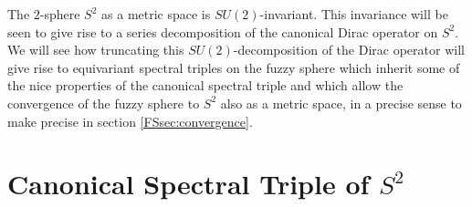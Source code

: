 The $2$-sphere $S^2$ as a metric space is $SU(2)$-invariant. This invariance will be seen to give rise to a series decomposition of the canonical Dirac operator on $S^2$. We will see how truncating this $SU(2)$-decomposition of the Dirac operator will give rise to equivariant spectral triples on the fuzzy sphere which inherit some of the nice properties of the canonical spectral triple and which allow the convergence of the fuzzy sphere to $S^2$ also as a metric space, in a precise sense to make precise in section \ref{FSsec:convergence}.


\section{Canonical Spectral Triple of $S^2$}





    
    

